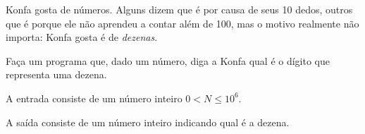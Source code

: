 
%
%
%

Konfa gosta de números. Alguns dizem que é por causa de seus 10 dedos, outros
que é porque ele não aprendeu a contar além de 100, mas o motivo realmente não
importa: Konfa gosta é de \emph{dezenas}.

Faça um programa que, dado um número, diga a Konfa qual é o dígito que representa
uma dezena.

\Entrada%
A entrada consiste de um número inteiro $0 < N \leq 10^6$.

\Saida%
A saída consiste de um número inteiro indicando qual é a dezena.


%
